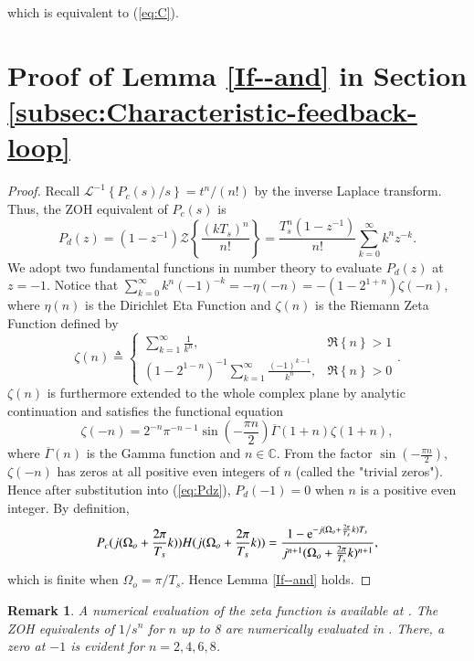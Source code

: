 \documentclass [11pt, proquest] {uwthesis}[2020/02/24]
\newtheorem{remark}{Remark}
\begin{document}
\noindent which is equivalent to (\ref{eq:C}).

\section{Proof of Lemma \mbox{\ref{If--and}} in Section \ref{subsec:Characteristic-feedback-loop}} \label{chapA:Proof-of-Lemma-3}

\begin{proof}
Recall $\mathcal{L}^{-1}\left\{ P_{c}(s)/s\right\} =t^{n}/(n!)$ by
the inverse Laplace transform. Thus, the ZOH equivalent of $P_{c}(s)$
is
\begin{equation}
P_{d}(z)=(1-z^{-1})\mathcal{Z}\left\{ \frac{(kT_{s})^{n}}{n!}\right\} =\frac{T_{s}^{n}(1-z^{-1})}{n!}\sum_{k=0}^{\infty}k^{n}z^{-k}.\label{eq:Pdz}
\end{equation}
We adopt two fundamental functions in number theory to evaluate $P_{d}(z)$
at $z=-1$. Notice that $\sum_{k=0}^{\infty}k^{n}(-1)^{-k}=-\eta(-n)=-(1-2^{1+n})\zeta(-n)$,
where $\eta(n)$ is the Dirichlet Eta Function and $\zeta(n)$ is
the Riemann Zeta Function \cite{23} defined by
\[
\zeta(n)\triangleq\begin{cases}
\sum_{k=1}^{\infty}\frac{1}{k^{n}}, & \Re\left\{ n\right\} >1\\
(1-2^{1-n})^{-1}\sum_{k=1}^{\infty}\frac{(-1)^{k-1}}{k^{n}}, & \Re\left\{ n\right\} >0
\end{cases}.
\]
$\zeta(n)$ is furthermore extended to the whole complex plane by
analytic continuation and satisfies the functional equation \cite[Chapter 2]{titchmarsh1986theory,edwards1974riemanns}
\begin{equation}
\zeta(-n)=2^{-n}\pi^{-n-1}\sin\left(-\frac{\pi n}{2}\right)\overline{\Gamma}(1+n)\zeta(1+n),\label{eq:RFE-1}
\end{equation}
where $\overline{\Gamma}(n)$ is the Gamma function and $n\in\mathbb{C}$.
From the factor $\sin\left(-\frac{\pi n}{2}\right)$, $\zeta(-n)$
has zeros at all positive even integers of $n$ (called the "trivial
zeros"). Hence after substitution into (\ref{eq:Pdz}),
$P_{d}(-1)=0$ when $n$ is a positive even integer. By definition,
\[
P_{c}(j(\Omega_{o}+\frac{2\pi}{T_{s}}k))H(j(\Omega_{o}+\frac{2\pi}{T_{s}}k))=\frac{1-\mathrm{e}^{-j(\Omega_{o}+\frac{2\pi}{T_{s}}k)T_{s}}}{j^{n+1}(\Omega_{o}+\frac{2\pi}{T_{s}}k)^{n+1}},
\]
which is finite when $\Omega_{o}=\pi/T_{s}$. Hence Lemma \ref{If--and}
holds.
\end{proof}
\begin{remark}A numerical evaluation of the zeta function is available
at \cite{wolframZeta}. The ZOH equivalents of $1/s^{n}$ for $n$
up to 8 are numerically evaluated in \cite{Astrom1984_zerosOfSampledSys}.
There, a zero at $-1$ is evident for $n=2,4,6,8$. \end{remark}
\end{document}
